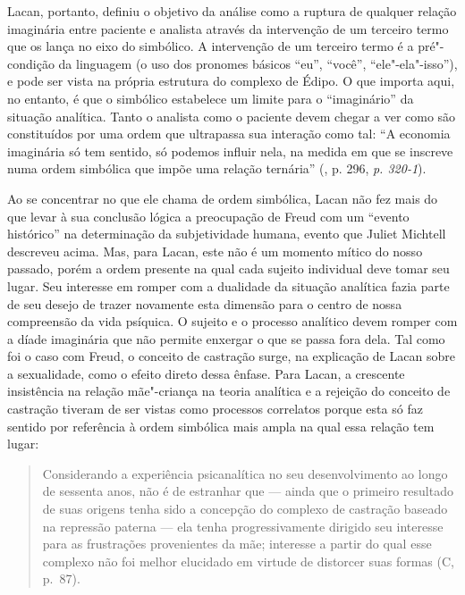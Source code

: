 Lacan, portanto, definiu o objetivo da análise como a ruptura de
qualquer relação imaginária entre paciente e analista através da
intervenção de um terceiro termo que os lança no eixo do simbólico. A
intervenção de um terceiro termo é a pré"-condição da linguagem (o uso
dos pronomes básicos ``eu'', ``você'', ``ele"-ela"-isso''), e pode ser
vista na própria estrutura do complexo de Édipo. O que importa aqui, no
entanto, é que o simbólico estabelece um limite para o ``imaginário'' da
situação analítica. Tanto o analista como o paciente devem chegar a ver
como são constituídos por uma ordem que ultrapassa sua interação como
tal: ``A economia imaginária só tem sentido, só podemos influir nela, na
medida em que se inscreve numa ordem simbólica que impõe uma relação
ternária'' (, p. 296, \emph{p. 320-1}).

Ao se concentrar no que ele chama de ordem simbólica, Lacan não fez mais
do que levar à sua conclusão lógica a preocupação de Freud com um
``evento histórico'' na determinação da subjetividade humana, evento que
Juliet Michtell descreveu acima. Mas, para Lacan, este não é um momento
mítico do nosso passado, porém a ordem presente na qual cada sujeito
individual deve tomar seu lugar. Seu interesse em romper com a dualidade
da situação analítica fazia parte de seu desejo de trazer novamente esta
dimensão para o centro de nossa compreensão da vida psíquica. O sujeito
e o processo analítico devem romper com a díade imaginária que não
permite enxergar o que se passa fora dela. Tal como foi o caso com
Freud, o conceito de castração surge, na explicação de Lacan sobre a
sexualidade, como o efeito direto dessa ênfase. Para Lacan, a crescente
insistência na relação mãe"-criança na teoria analítica e a rejeição do
conceito de castração tiveram de ser vistas como processos correlatos
porque esta só faz sentido por referência à ordem simbólica mais ampla
na qual essa relação tem lugar:

\begin{quote}
Considerando a experiência psicanalítica no seu desenvolvimento ao longo
de sessenta anos, não é de estranhar que --- ainda que o primeiro
resultado de suas origens tenha sido a concepção do complexo de
castração baseado na repressão paterna --- ela tenha progressivamente
dirigido seu interesse para as frustrações provenientes da mãe;
interesse a partir do qual esse complexo não foi melhor elucidado em
virtude de distorcer suas formas (C, p.~87).
\end{quote}

